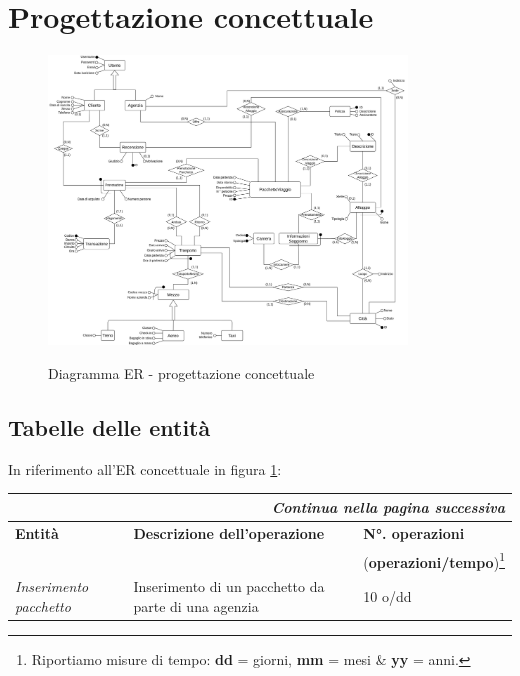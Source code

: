\section{Progettazione concettuale}

\begin{figure}
    \centering
    \caption{Diagramma ER - progettazione concettuale}
    \includegraphics[width=0.85\textwidth]{assets/ER_concettuale.png}
    \label{fig:er_concettuale}
\end{figure}

\subsection{Tabelle delle entità}
In riferimento all'ER concettuale in figura \ref{fig:er_concettuale}:
\begin{center}
    \begin{tabularx}{\textwidth}{p{} X p{}}
        \caption{Tabella delle entità}\\\toprule\endfirsthead
        \toprule\endhead
        \midrule\multicolumn{3}{r}{\itshape Continua nella pagina successiva}\\\midrule\endfoot
        \bottomrule\endlastfoot
        \textbf{Entità} & \textbf{Descrizione dell'operazione} & \textbf{N°. operazioni}
        \\
        && (\textbf{operazioni/tempo})\footnote{Riportiamo misure di tempo: \textbf{dd} = giorni, \textbf{mm} = mesi \& \textbf{yy} = anni.}
        \\\midrule
        \emph{Inserimento pacchetto} & Inserimento di un pacchetto da parte di una agenzia & 10 o/dd
        \\
    \end{tabularx}
\end{center}

